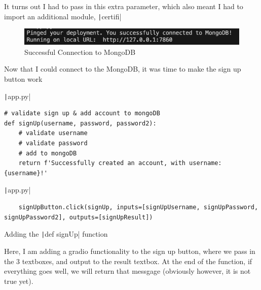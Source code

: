 \documentclass[12pt]{report}
\newcommand{\pil}[1]{\protect\texttt|#1|}
\begin{document}
It turns out I had to pass in this extra parameter, which also meant I had to import an additional module, \pil{certifi}

\begin{figure}[H]
\centering
\includegraphics[width=14cm]{ss15.5.png}
\caption{Successful Connection to MongoDB}\label{fig:ss15.5}
\end{figure}

\begin{center}
\end{center}

Now that I could connect to the MongoDB, it was time to make the sign up button work

\begin{listing}[H]
\pil{app.py}
\begin{verbatim}
# validate sign up & add account to mongoDB
def signUp(username, password, password2):
    # validate username
    # validate password
    # add to mongoDB
    return f'Successfully created an account, with username: {username}!'
\end{verbatim}
\pil{app.py}
\begin{verbatim}
    signUpButton.click(signUp, inputs=[signUpUsername, signUpPassword, signUpPassword2], outputs=[signUpResult])
\end{verbatim}
\caption{Adding the \pil{def signUp} function}\label{cs:signUp}
\end{listing}

Here, I am adding a gradio functionality to the sign up button, where we pass in the 3 textboxes, and output to the result textbox. At the end of the function, if everything goes well, we will return that messgage (obviously however, it is not true yet).
\end{document}
